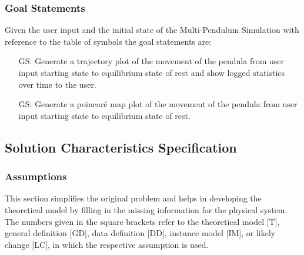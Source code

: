 \documentclass[12pt]{article}
\newcounter{goalnum} %
\newcommand{\progname}{Multi-Pendulum Simulation }
\begin{document}
\subsubsection{Goal Statements}

\noindent Given the user input and the initial state of the \progname with reference to the table of symbols the goal
statements are: 

\begin{itemize}
\item[GS\refstepcounter{goalnum}\thegoalnum:] Generate a trajectory plot of 
the movement of the pendula from user input starting state to equilibrium state of rest and show logged
statistics over time to the user.
\item[GS\refstepcounter{goalnum}\thegoalnum:] Generate a poincaré map plot of 
the movement of the pendula from user input starting state to equilibrium state of rest.
\end{itemize}


\newpage

\subsection{Solution Characteristics Specification}

\subsubsection{Assumptions}

This section simplifies the original problem and helps in developing the
theoretical model by filling in the missing information for the physical
system. The numbers given in the square brackets refer to the theoretical model
[T], general definition [GD], data definition [DD], instance model [IM], or
likely change [LC], in which the respective assumption is used.
\end{document}
